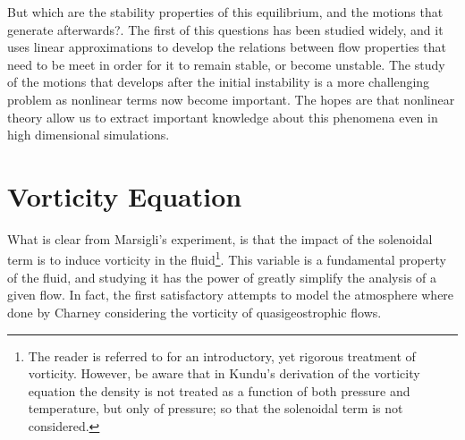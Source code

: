 But which are the stability
properties of this equilibrium, and the motions that generate afterwards?. The first of
this questions has been studied widely, and it uses linear approximations
to develop the relations between flow properties that need to be meet in
order for it to remain stable, or become unstable. The study of the motions that
develops after the initial instability is a more challenging problem as
nonlinear terms now become important. The hopes are that nonlinear theory
allow us to extract important knowledge about this phenomena even in high dimensional
simulations.

\section{Vorticity Equation}
\label{s:vorticity}

What is clear from Marsigli's experiment, is that the impact of the
solenoidal term is to induce vorticity in the fluid\footnote{The reader
is referred to  for an introductory, yet rigorous
treatment of vorticity. However, be aware that in Kundu's derivation of the
vorticity equation the density is not treated as a function of both
pressure and temperature, but only of pressure; so that the solenoidal
term is not considered.}. This variable is a fundamental property of the
fluid, and studying it has the power of greatly simplify the analysis of a
given flow. In fact, the first satisfactory attempts to model the atmosphere
where done by Charney considering the vorticity of quasigeostrophic flows.

